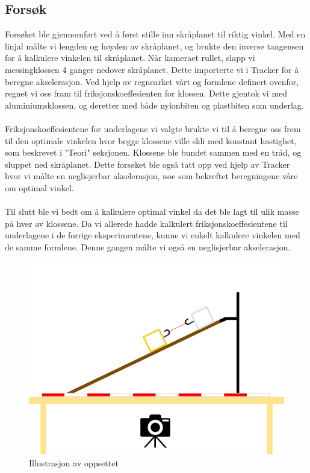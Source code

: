 \documentclass[10pt,a4paper]{report}
\begin{document}
\subsection*{Forsøk}
Forsøket ble gjennomført ved å først stille inn skråplanet til riktig vinkel. Med en linjal målte vi lengden og høyden av skråplanet, og brukte den inverse tangensen for å kalkulere vinkelen til skråplanet. Når kameraet rullet, slapp vi messingklossen 4 ganger nedover skråplanet. Dette importerte vi i Tracker for å beregne akselerasjon. Ved hjelp av regnearket vårt og formlene definert ovenfor, regnet vi oss fram til friksjonskoeffesienten for klossen. Dette gjentok vi med aluminiumsklossen, og deretter med både nylonbiten og plastbiten som underlag. \\
\\Friksjonskoeffesientene for underlagene vi valgte brukte vi til å beregne oss frem til den optimale vinkelen hvor begge klossene ville skli med konstant hastighet, som beskrevet i "Teori" seksjonen. Klossene ble bundet sammen med en tråd, og sluppet ned skråplanet. Dette forsøket ble også tatt opp ved hjelp av Tracker hvor vi målte en neglisjerbar akselerasjon, noe som bekreftet beregningene våre om optimal vinkel.\\
\\Til slutt ble vi bedt om å kalkulere optimal vinkel da det ble lagt til ulik masse på hver av klossene. Da vi allerede hadde kalkulert friksjonskoeffesientene til underlagene i de forrige eksperimentene, kunne vi enkelt kalkulere vinkelen med de samme formlene. Denne gangen målte vi også en neglisjerbar akselerasjon.

\begin{figure}
\centerline{\includegraphics[scale=0.5]{oppsett}}
\caption{Illustrasjon av oppsettet}
\label{oppsett}
\end{figure}
\end{document}
